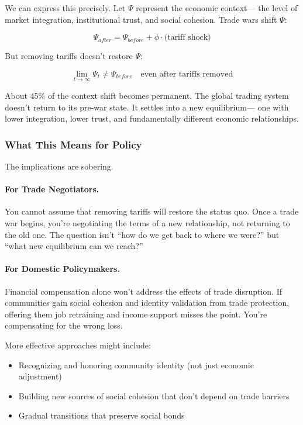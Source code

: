 We can express this precisely. Let $\Psi$ represent the economic context---
the level of market integration, institutional trust, and social cohesion. 
Trade wars shift $\Psi$:

\begin{equation}
\Psi_{after} = \Psi_{before} + \phi \cdot \text{(tariff shock)}
\end{equation}

But removing tariffs doesn't restore $\Psi$:

\begin{equation}
\lim_{t \to \infty} \Psi_t \neq \Psi_{before} \quad \text{even after tariffs removed}
\end{equation}

About 45\% of the context shift becomes permanent. The global trading system 
doesn't return to its pre-war state. It settles into a new equilibrium---
one with lower integration, lower trust, and fundamentally different 
economic relationships.

\subsubsection{What This Means for Policy}

The implications are sobering.

\paragraph{For Trade Negotiators.}
You cannot assume that removing tariffs will restore the status quo. 
Once a trade war begins, you're negotiating the terms of a new relationship, 
not returning to the old one. The question isn't ``how do we get back to 
where we were?'' but ``what new equilibrium can we reach?''

\paragraph{For Domestic Policymakers.}
Financial compensation alone won't address the effects of trade disruption. 
If communities gain social cohesion and identity validation from trade 
protection, offering them job retraining and income support misses 
the point. You're compensating for the wrong loss.

More effective approaches might include:
\begin{itemize}
    \item Recognizing and honoring community identity (not just economic adjustment)
    \item Building new sources of social cohesion that don't depend on trade barriers
    \item Gradual transitions that preserve social bonds
\end{itemize}

